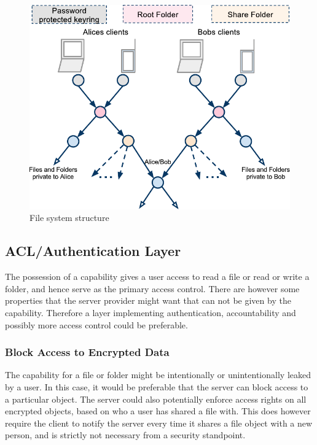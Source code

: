 \documentclass[pdftex,english,10pt,b5paper,twoside]{book}
\begin{document}
\begin{figure}[h!]
    \centering
    \includegraphics[width=\columnwidth]{ArchitectureFileSystem.pdf}
    \caption{File system structure}
    \label{fig:AS:filesystem}
\end{figure}

\subsection{ACL/Authentication Layer}

The possession of a capability gives a user access to read a file or read or
write a folder, and hence serve as the primary access control. There are
however some properties that the server provider might want that can not be
given by the capability. Therefore a layer implementing authentication,
accountability and possibly more access control could be preferable.

\subsubsection{Block Access to Encrypted Data}

The capability for a file or folder might be intentionally or unintentionally
leaked by a user. In this case, it would be preferable that the server can
block access to a particular object. The server could also potentially enforce
access rights on all encrypted objects, based on who a user has shared a file
with. This does however require the client to notify the server every time it
shares a file object with a new person, and is strictly not necessary from a
security standpoint.
\end{document}
